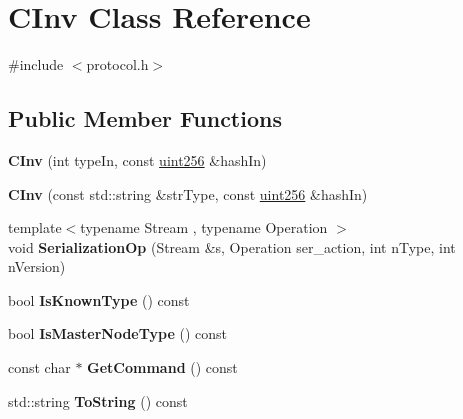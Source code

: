 \hypertarget{class_c_inv}{}\section{C\+Inv Class Reference}
\label{class_c_inv}


{\ttfamily \#include $<$protocol.\+h$>$}

\subsection*{Public Member Functions}
\begin{DoxyCompactItemize}
\item 
\mbox{\label{class_c_inv_a4c6e02df7b10378f876ecc76c6b50301}} 
{\bfseries C\+Inv} (int type\+In, const \mbox{\hyperlink{classuint256}{uint256}} \&hash\+In)
\item 
\mbox{\label{class_c_inv_a412cb8fdd0bfe185f770fec91a3e13c4}} 
{\bfseries C\+Inv} (const std\+::string \&str\+Type, const \mbox{\hyperlink{classuint256}{uint256}} \&hash\+In)
\item 
\mbox{\label{class_c_inv_a7f56c1696e6c5c7ca36c1637f94dd1a0}} 
{\footnotesize template$<$typename Stream , typename Operation $>$ }\\void {\bfseries Serialization\+Op} (Stream \&s, Operation ser\+\_\+action, int n\+Type, int n\+Version)
\item 
\mbox{\label{class_c_inv_a3da7d96ce51443a1bfe8ce5342d0afbe}} 
bool {\bfseries Is\+Known\+Type} () const
\item 
\mbox{\label{class_c_inv_ab96a3a729beb1092a87604667dc5baba}} 
bool {\bfseries Is\+Master\+Node\+Type} () const
\item 
\mbox{\label{class_c_inv_a29020c06b49edebfe9993adee93cf65a}} 
const char $\ast$ {\bfseries Get\+Command} () const
\item 
\mbox{\label{class_c_inv_a5bf13e9595035d2155b04cceb848c37d}} 
std\+::string {\bfseries To\+String} () const
\end{DoxyCompactItemize}
